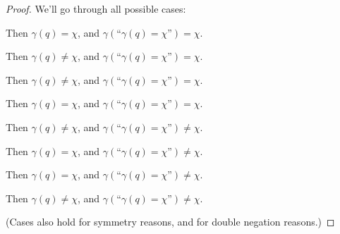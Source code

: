 \documentclass[twoside,twocolumn,a4paper,11pt]{article}
\theoremstyle{definition}
\begin{document}
\begin{proof}
We'll go through all possible cases:

\begin{description}[itemsep=-3pt,topsep=1pt]
\item[\(\bm{q\!=\!1, \gamma\!=\!\mathcal{T}, \chi\!=\!1}\):] \hspace{-0.0em}Then 
$\gamma(q)\!=\!\chi$, and
\( \gamma( \mbox{``}\gamma(q)\!=\!\chi\mbox{''}) \!=\! \chi \).
\item[\(\bm{q\!=\!1, \gamma\!=\!\mathcal{T}, \chi\!=\!0}\):] \hspace{-0.0em}Then 
$\gamma(q)\!\neq\!\chi$, and
\( \gamma( \mbox{``}\gamma(q)\!=\!\chi\mbox{''}) \!=\! \chi \).
\item[\(\bm{q\!=\!1, \gamma\!=\!\mathcal{F}, \chi\!=\!1}\):] \hspace{-0.0em}Then 
$\gamma(q)\!\neq\!\chi$, and
\( \gamma( \mbox{``}\gamma(q)\!=\!\chi\mbox{''}) \!=\! \chi \).
\item[\(\bm{q\!=\!1, \gamma\!=\!\mathcal{F}, \chi\!=\!0}\):] \hspace{-0.0em}Then 
$\gamma(q)\!=\!\chi$, and
\( \gamma( \mbox{``}\gamma(q)\!=\!\chi\mbox{''}) \!=\! \chi \).
\item[\(\bm{q\!=\!0, \gamma\!=\!\mathcal{T}, \chi\!=\!1}\):] \hspace{-0.0em}Then 
$\gamma(q)\!\neq\!\chi$, and
\( \gamma( \mbox{``}\gamma(q)\!=\!\chi\mbox{''}) \!\neq\! \chi \).
\item[\(\bm{q\!=\!0, \gamma\!=\!\mathcal{T}, \chi\!=\!0}\):] \hspace{-0.0em}Then 
$\gamma(q)\!=\!\chi$, and
\( \gamma( \mbox{``}\gamma(q)\!=\!\chi\mbox{''}) \!\neq\! \chi \).
\item[\(\bm{q\!=\!0, \gamma\!=\!\mathcal{F}, \chi\!=\!1}\):] \hspace{-0.0em}Then 
$\gamma(q)\!=\!\chi$, and
\( \gamma( \mbox{``}\gamma(q)\!=\!\chi\mbox{''}) \!\neq\! \chi \).
\item[\(\bm{q\!=\!0, \gamma\!=\!\mathcal{F}, \chi\!=\!0}\):] \hspace{-0.0em}Then 
$\gamma(q)\!\neq\!\chi$, and
\( \gamma( \mbox{``}\gamma(q)\!=\!\chi\mbox{''}) \!\neq\! \chi \).
\end{description}
(Cases also hold for symmetry reasons, and for double negation reasons.)
\end{proof}
\end{document}
